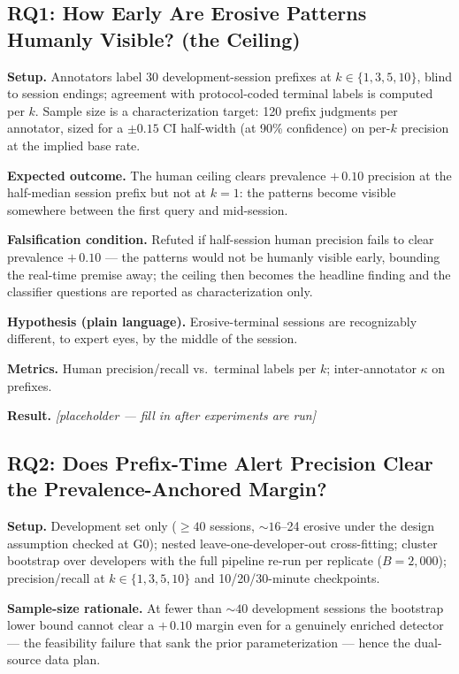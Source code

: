 \documentclass[11pt]{article}
\begin{document}
\subsection{RQ1: How Early Are Erosive Patterns Humanly Visible? (the Ceiling)}

\textbf{Setup.} Annotators label 30 development-session prefixes at $k \in \{1,3,5,10\}$, blind to session endings; agreement with protocol-coded terminal labels is computed per $k$. Sample size is a characterization target: 120 prefix judgments per annotator, sized for a $\pm 0.15$ CI half-width (at 90\% confidence) on per-$k$ precision at the implied base rate.

\textbf{Expected outcome.} The human ceiling clears prevalence $+\,0.10$ precision at the half-median session prefix but not at $k = 1$: the patterns become visible somewhere between the first query and mid-session.

\textbf{Falsification condition.} Refuted if half-session human precision fails to clear prevalence $+\,0.10$ --- the patterns would not be humanly visible early, bounding the real-time premise away; the ceiling then becomes the headline finding and the classifier questions are reported as characterization only.

\textbf{Hypothesis (plain language).} Erosive-terminal sessions are recognizably different, to expert eyes, by the middle of the session.

\textbf{Metrics.} Human precision/recall vs.\ terminal labels per $k$; inter-annotator $\kappa$ on prefixes.

\textbf{Result.} \emph{[placeholder --- fill in after experiments are run]}

\subsection{RQ2: Does Prefix-Time Alert Precision Clear the Prevalence-Anchored Margin?}

\textbf{Setup.} Development set only ($\geq 40$ sessions, ${\sim}16$--24 erosive under the design assumption checked at G0); nested leave-one-developer-out cross-fitting; cluster bootstrap over developers with the full pipeline re-run per replicate ($B = 2{,}000$); precision/recall at $k \in \{1,3,5,10\}$ and 10/20/30-minute checkpoints.

\textbf{Sample-size rationale.} At fewer than ${\sim}40$ development sessions the bootstrap lower bound cannot clear a $+\,0.10$ margin even for a genuinely enriched detector --- the feasibility failure that sank the prior parameterization --- hence the dual-source data plan.
\end{document}
